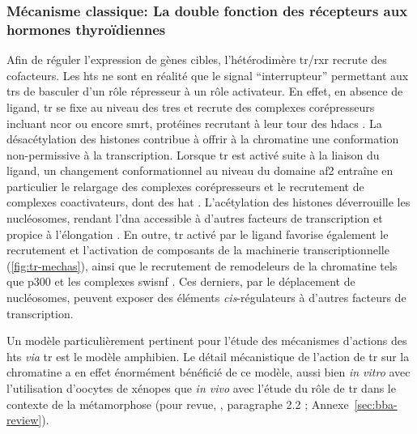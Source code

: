 \documentclass[../main.tex]{subfiles}
\begin{document}
\subsubsection{Mécanisme classique: La double fonction des récepteurs aux hormones thyroïdiennes}
Afin de réguler l'expression de gènes cibles, l'hétérodimère \gls{tr}/\gls{rxr} recrute des cofacteurs.
Les \glspl{ht} ne sont en réalité que le signal ``interrupteur'' permettant aux \glspl{tr} de basculer d'un rôle répresseur à un rôle activateur.
En effet, en absence de ligand, \gls{tr} se fixe au niveau des \glspl{tre} et recrute des complexes corépresseurs incluant \gls{ncor} ou encore \gls{smrt}, protéines recrutant à leur tour des \glspl{hdac} \citep{Wong1998}.
La désacétylation des histones contribue à offrir à la chromatine une conformation non-permissive à la transcription.
Lorsque \gls{tr} est activé suite à la liaison du ligand, un changement conformationnel au niveau du domaine \gls{af2} entraîne en particulier le relargage des complexes corépresseurs et le recrutement de complexes coactivateurs, dont des \gls{hat} \citep{Wolffe1997}.
L'acétylation des histones déverrouille les nucléosomes, rendant l'\gls{dna} accessible à d'autres facteurs de transcription et propice à l'élongation \citep{Wong1997}.
En outre, \gls{tr} activé par le ligand favorise également le recrutement et l'activation de composants de la machinerie transcriptionnelle (\autoref{fig:tr-mechas}), ainsi que le recrutement de remodeleurs de la chromatine tels que p300 et les complexes \gls{swisnf} \citep{Huang2003,Heimeier2008}.
Ces derniers, par le déplacement de nucléosomes, peuvent exposer des éléments \textit{cis}-régulateurs à d'autres facteurs de transcription.
\par
Un modèle particulièrement pertinent pour l'étude des mécanismes d'actions des \glspl{ht} \textit{via} \gls{tr} est le modèle amphibien.
Le détail mécanistique de l'action de \gls{tr} sur la chromatine a en effet énormément bénéficié de ce modèle, aussi bien \textit{in vitro} avec l'utilisation d'oocytes de xénopes que \textit{in vivo} avec l'étude du rôle de \gls{tr} dans le contexte de la métamorphose (pour revue, \citealp{Grimaldi2012}, paragraphe 2.2 ; Annexe~\ref{sec:bba-review}).
\end{document}
